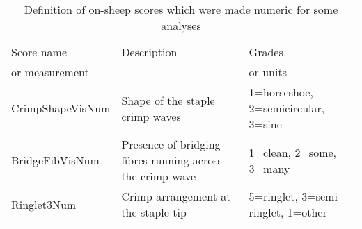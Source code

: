 %

\begin{table}[htp]
\centering
\caption{Definition of on-sheep scores  which were made numeric for some analyses}
\label{tab:scoresnum}
\vspace{0.1in}
\begin{tabular}{|p{1.5in}|p{2.0in}|p{0.9in}|}  \hline
     Score name & Description  & Grades  \\ 
  or measurement  &    & or units  \\ \hline
  CrimpShapeVisNum & Shape of the staple crimp waves    & 1=horseshoe, 2=semicircular, 3=sine \\
  BridgeFibVisNum  & Presence of bridging fibres running across the crimp wave & 1=clean, 2=some, 3=many \\ \hline
  Ringlet3Num     & Crimp arrangement at the staple tip & 5=ringlet, 3=semi-ringlet, 1=other \\ \hline
\end{tabular}
\end{table}

%
